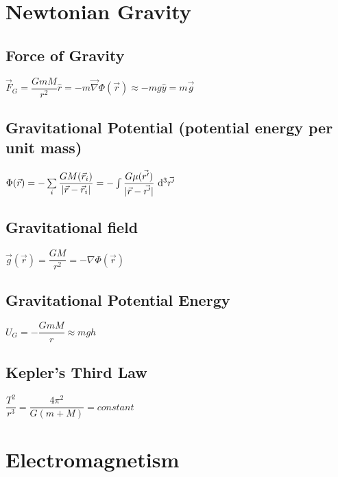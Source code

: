 	\section{Newtonian Gravity}	

\subsection{Force of Gravity}
\begin{itemize}
\itemt \( \vec{F}_G = \dfrac{GmM}{r^2} \hat{r} = -m\vec{\nabla}\Phi(\vec{r}) \approx -mg\hat{y} = m\vec{g}\)
\end{itemize}	

\subsection{Gravitational Potential (potential energy per unit mass)}		
\begin{itemize}
\itemt \( \Phi(\vec{r}) = -\sum\limits_{i} \dfrac{GM(\vec{r}_i)}{|\vec{r}-\vec{r}_i|} = - \int \dfrac{G\mu(\vec{r'})}{|\vec{r} - \vec{r'}|} \ \mathrm{d}^3\vec{r'} \)
\end{itemize}

\subsection{Gravitational field}
\begin{itemize}
\itemt \(\vec{g}(\vec{r}) = \dfrac{GM}{r^2} = -\nabla\Phi(\vec{r})\)
\end{itemize}										

\subsection{Gravitational Potential Energy}		
\begin{itemize}
\itemt \( U_G = -\dfrac{GmM}{r} \approx mgh\)
\end{itemize}

\subsection{Kepler's Third Law}		
\begin{itemize}
\itemt \( \dfrac{T^2}{r^3} = \dfrac{4\pi^2}{G(m+M)} = constant\)
\end{itemize}	

	\section{Electromagnetism}

